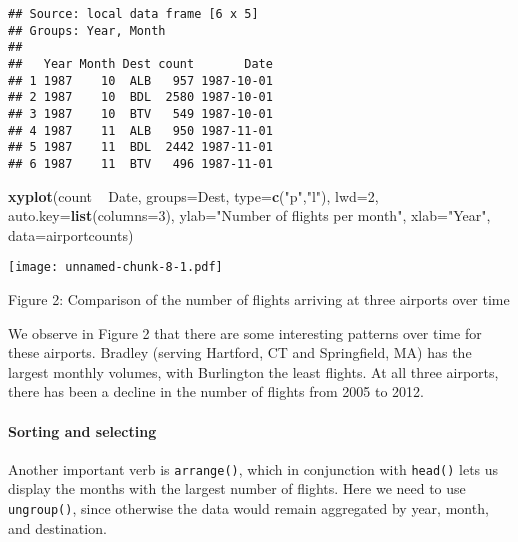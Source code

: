 \documentclass[]{article}
\newenvironment{Shaded}{\begin{snugshade}}{\end{snugshade}}
\newcommand{\KeywordTok}[1]{\textcolor[rgb]{0.13,0.29,0.53}{\textbf{{#1}}}}
\newcommand{\DataTypeTok}[1]{\textcolor[rgb]{0.13,0.29,0.53}{{#1}}}
\newcommand{\DecValTok}[1]{\textcolor[rgb]{0.00,0.00,0.81}{{#1}}}
\newcommand{\StringTok}[1]{\textcolor[rgb]{0.31,0.60,0.02}{{#1}}}
\newcommand{\NormalTok}[1]{{#1}}
\begin{document}
\begin{verbatim}
## Source: local data frame [6 x 5]
## Groups: Year, Month
## 
##   Year Month Dest count       Date
## 1 1987    10  ALB   957 1987-10-01
## 2 1987    10  BDL  2580 1987-10-01
## 3 1987    10  BTV   549 1987-10-01
## 4 1987    11  ALB   950 1987-11-01
## 5 1987    11  BDL  2442 1987-11-01
## 6 1987    11  BTV   496 1987-11-01
\end{verbatim}

\begin{Shaded}
\begin{Highlighting}[]
\KeywordTok{xyplot}\NormalTok{(count ~}\StringTok{ }\NormalTok{Date, }\DataTypeTok{groups=}\NormalTok{Dest, }\DataTypeTok{type=}\KeywordTok{c}\NormalTok{(}\StringTok{"p"}\NormalTok{,}\StringTok{"l"}\NormalTok{), }\DataTypeTok{lwd=}\DecValTok{2}\NormalTok{, }\DataTypeTok{auto.key=}\KeywordTok{list}\NormalTok{(}\DataTypeTok{columns=}\DecValTok{3}\NormalTok{),}
       \DataTypeTok{ylab=}\StringTok{"Number of flights per month"}\NormalTok{, }\DataTypeTok{xlab=}\StringTok{"Year"}\NormalTok{, }\DataTypeTok{data=}\NormalTok{airportcounts)}
\end{Highlighting}
\end{Shaded}

\texttt{[image: unnamed-chunk-8-1.pdf]}

Figure 2: Comparison of the number of flights arriving at three airports
over time

We observe in Figure 2 that there are some interesting patterns over
time for these airports. Bradley (serving Hartford, CT and Springfield,
MA) has the largest monthly volumes, with Burlington the least flights.
At all three airports, there has been a decline in the number of flights
from 2005 to 2012.

\paragraph{Sorting and selecting}\label{sorting-and-selecting}

Another important verb is \texttt{arrange()}, which in conjunction with
\texttt{head()} lets us display the months with the largest number of
flights. Here we need to use \texttt{ungroup()}, since otherwise the
data would remain aggregated by year, month, and destination.

\begin{Shaded}
\end{Shaded}
\end{document}
